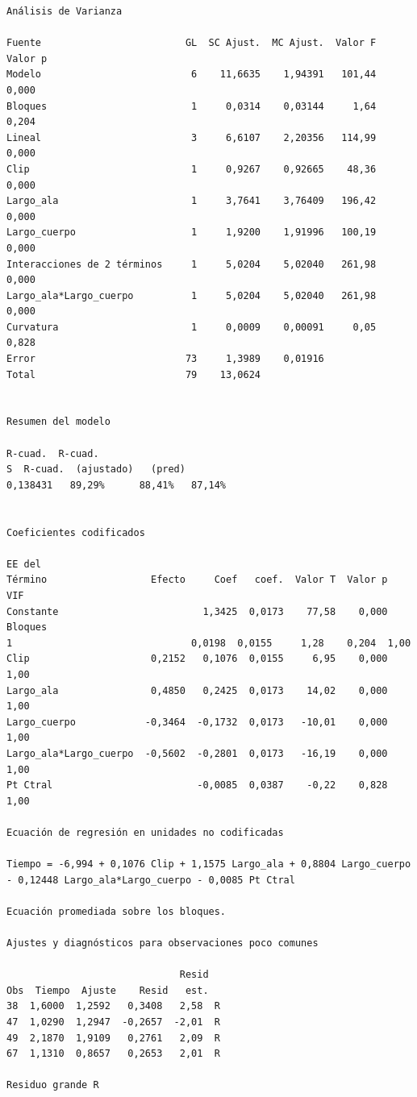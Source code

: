 \documentclass[12pt,a4paper,twoside,openright,titlepage,final]{article}
\begin{document}
\begin{verbatim}
Análisis de Varianza

Fuente                         GL  SC Ajust.  MC Ajust.  Valor F  Valor p
Modelo                          6    11,6635    1,94391   101,44    0,000
Bloques                         1     0,0314    0,03144     1,64    0,204
Lineal                          3     6,6107    2,20356   114,99    0,000
Clip                            1     0,9267    0,92665    48,36    0,000
Largo_ala                       1     3,7641    3,76409   196,42    0,000
Largo_cuerpo                    1     1,9200    1,91996   100,19    0,000
Interacciones de 2 términos     1     5,0204    5,02040   261,98    0,000
Largo_ala*Largo_cuerpo          1     5,0204    5,02040   261,98    0,000
Curvatura                       1     0,0009    0,00091     0,05    0,828
Error                          73     1,3989    0,01916
Total                          79    13,0624


Resumen del modelo

R-cuad.  R-cuad.
S  R-cuad.  (ajustado)   (pred)
0,138431   89,29%      88,41%   87,14%


Coeficientes codificados

EE del
Término                  Efecto     Coef   coef.  Valor T  Valor p   VIF
Constante                         1,3425  0,0173    77,58    0,000
Bloques
1                               0,0198  0,0155     1,28    0,204  1,00
Clip                     0,2152   0,1076  0,0155     6,95    0,000  1,00
Largo_ala                0,4850   0,2425  0,0173    14,02    0,000  1,00
Largo_cuerpo            -0,3464  -0,1732  0,0173   -10,01    0,000  1,00
Largo_ala*Largo_cuerpo  -0,5602  -0,2801  0,0173   -16,19    0,000  1,00
Pt Ctral                         -0,0085  0,0387    -0,22    0,828  1,00

Ecuación de regresión en unidades no codificadas

Tiempo = -6,994 + 0,1076 Clip + 1,1575 Largo_ala + 0,8804 Largo_cuerpo
- 0,12448 Largo_ala*Largo_cuerpo - 0,0085 Pt Ctral

Ecuación promediada sobre los bloques.

Ajustes y diagnósticos para observaciones poco comunes

                              Resid
Obs  Tiempo  Ajuste    Resid   est.
38  1,6000  1,2592   0,3408   2,58  R
47  1,0290  1,2947  -0,2657  -2,01  R
49  2,1870  1,9109   0,2761   2,09  R
67  1,1310  0,8657   0,2653   2,01  R

Residuo grande R
\end{verbatim}
\end{document}
